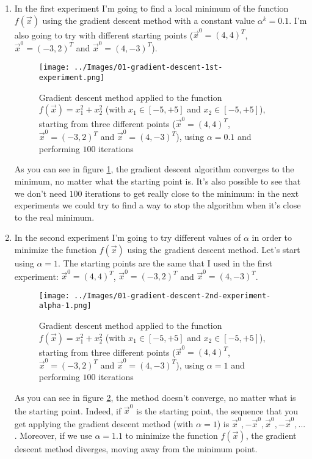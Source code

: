         \begin{enumerate}
            \item In the first experiment I'm going to find a local minimum of the function \(f(\vec{x})\) using the gradient descent method with a constant value \(\alpha^k = 0.1\). I'm also going to try with different starting points (\(\vec{x}^0 = (4,4)^T\), \(\vec{x}^0 = (-3,2)^T\) and \(\vec{x}^0 = (4,-3)^T\)).
            \begin{figure}
                \centering
                \texttt{[image: ../Images/01-gradient-descent-1st-experiment.png]}
                \caption{Gradient descent method applied to the function \(f(\vec{x}) = x_{1}^{2} + x_{2}^{2}\) (with \(x_1 \in [-5, +5]\) and \(x_2 \in [-5, +5]\)), starting from three different points (\(\vec{x}^0 = (4,4)^T\), \(\vec{x}^0 = (-3,2)^T\) and \(\vec{x}^0 = (4,-3)^T\)), using \(\alpha = 0.1\) and performing \(100\) iterations}
                \label{gradient-descent-1st-experiment}
            \end{figure}
            As you can see in figure \ref{gradient-descent-1st-experiment}, the gradient descent algorithm converges to the minimum, no matter what the starting point is. It's also possible to see that we don't need \(100\) iterations to get really close to the minimum: in the next experiments we could try to find a way to stop the algorithm when it's close to the real minimum.
            \item In the second experiment I'm going to try different values of \(\alpha\) in order to minimize the function \(f(\vec{x})\) using the gradient descent method. Let's start using \(\alpha = 1\). The starting points are the same that I used in the first experiment: \(\vec{x}^0 = (4,4)^T\), \(\vec{x}^0 = (-3,2)^T\) and \(\vec{x}^0 = (4,-3)^T\).
            \begin{figure}
                \centering
                \texttt{[image: ../Images/01-gradient-descent-2nd-experiment-alpha-1.png]}
                \caption{Gradient descent method applied to the function \(f(\vec{x}) = x_{1}^{2} + x_{2}^{2}\) (with \(x_1 \in [-5, +5]\) and \(x_2 \in [-5, +5]\)), starting from three different points (\(\vec{x}^0 = (4,4)^T\), \(\vec{x}^0 = (-3,2)^T\) and \(\vec{x}^0 = (4,-3)^T\)), using \(\alpha = 1\) and performing \(100\) iterations}
                \label{gradient-descent-2nd-experiment-alpha-1}
            \end{figure}
            As you can see in figure \ref{gradient-descent-2nd-experiment-alpha-1}, the method doesn't converge, no matter what is the starting point. Indeed, if \(\vec{x}^0\) is the starting point, the sequence that you get applying the gradient descent method (with \(\alpha = 1\)) is \(\vec{x}^0, -\vec{x}^0, \vec{x}^0, -\vec{x}^0, ...\). Moreover, if we use \(\alpha = 1.1\) to minimize the function \(f(\vec{x})\), the gradient descent method diverges, moving away from the minimum point.

\end{enumerate}
